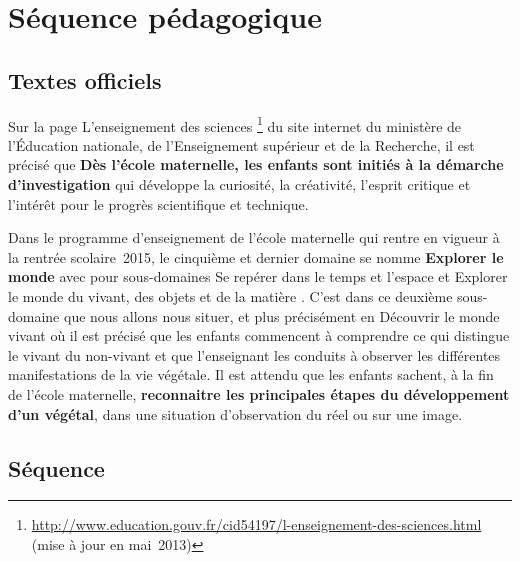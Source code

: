 \section{Séquence pédagogique}
\subsection{Textes officiels}
Sur la page \og L’enseignement des sciences \fg{}\footnote{\url{http://www.education.gouv.fr/cid54197/l-enseignement-des-sciences.html} (mise à jour en mai~2013)} du site internet du ministère de l’Éducation nationale, de l’Enseignement supérieur et de la Recherche, il est précisé que \og \textbf{Dès l’école maternelle, les enfants sont initiés à la démarche d’investigation} qui développe la curiosité, la créativité, l’esprit critique et l’intérêt pour le progrès scientifique et technique. \fg{}

Dans le programme d’enseignement de l’école maternelle \cite{BO2015} qui rentre en vigueur à la rentrée scolaire~2015, le cinquième et dernier domaine se nomme \og \textbf{Explorer le monde} \fg{} avec pour sous-domaines \og Se repérer dans le temps et l’espace \fg{} et \og Explorer le monde du vivant, des objets et de la matière \fg{}. C’est dans ce deuxième sous-domaine que nous allons nous situer, et plus précisément en \og Découvrir le monde vivant \fg{} où il est précisé que les enfants commencent à comprendre ce qui distingue le vivant du non-vivant et que l’enseignant les conduits à observer les différentes manifestations de la vie végétale. Il est attendu que les enfants sachent, à la fin de l’école maternelle, \textbf{reconnaitre les principales étapes du développement d’un végétal}, dans une situation d’observation du réel ou sur une image.

\subsection{Séquence}

\makeatletter
\ifx\NbSeancestocke\@undefined\relax\else\setcounter{NbSeance}{\NbSeancestocke}\fi
\ifx\DureeTotalestockee\@undefined\relax\else\setcounter{DureeTotale}{\DureeTotalestockee}\fi
\makeatother

%

